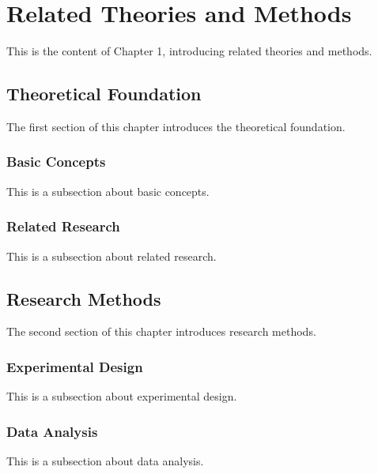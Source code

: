 \chapter{Related Theories and Methods}

This is the content of Chapter 1, introducing related theories and methods.

\section{Theoretical Foundation}
The first section of this chapter introduces the theoretical foundation.

\subsection{Basic Concepts}
This is a subsection about basic concepts.

\subsection{Related Research}
This is a subsection about related research.

\section{Research Methods}
The second section of this chapter introduces research methods.

\subsection{Experimental Design}
This is a subsection about experimental design.

\subsection{Data Analysis}
This is a subsection about data analysis.